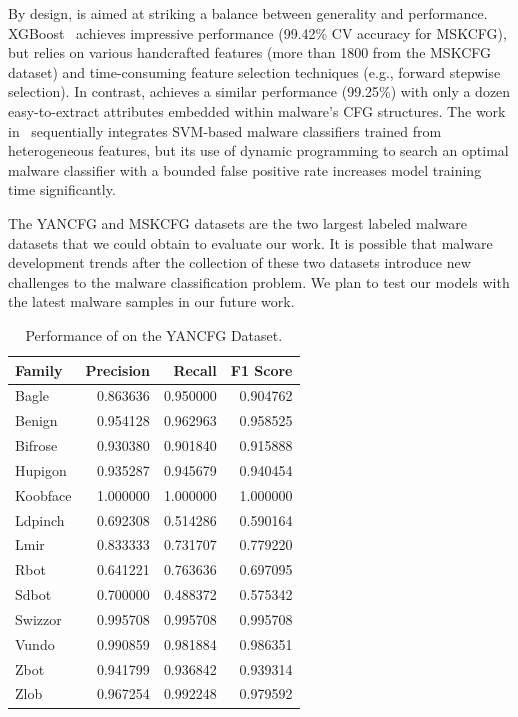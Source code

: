 By design, \sysname is aimed at striking a balance between generality and performance.
XGBoost~\cite{NovelFeatureFusion} achieves impressive performance (99.42\% CV accuracy for MSKCFG), but relies on various handcrafted features (more than 1800 from the MSKCFG dataset) and time-consuming feature selection techniques (e.g., forward stepwise selection).
In contrast, \sysname achieves a similar performance (99.25\%) with only a dozen easy-to-extract attributes embedded within malware’s CFG structures.
The work in~\cite{YanDataset} sequentially integrates SVM-based malware classifiers trained from heterogeneous features,
but its use of dynamic programming to search an optimal malware classifier with a bounded false positive rate increases model training time significantly.

The YANCFG and MSKCFG datasets are the two largest labeled malware datasets that we could obtain to evaluate our work.
It is possible that malware development trends after the collection of these two datasets introduce new challenges to the malware classification problem.
We plan to test our models with the latest malware samples in our future work.


\begin{table}
    \caption{Performance of \sysname on the YANCFG Dataset.}
    \begin{center}
        \begin{tabular}{l|rrr}
            \hline
            Family &  Precision &    Recall &  F1 Score \\
            \hline
            \hline
            Bagle &   0.863636 &  0.950000 &  0.904762 \\
            Benign &   0.954128 &  0.962963 &  0.958525 \\
            Bifrose &   0.930380 &  0.901840 &  0.915888 \\
            Hupigon &   0.935287 &  0.945679 &  0.940454 \\
            Koobface &   1.000000 &  1.000000 &  1.000000 \\
            Ldpinch &   0.692308 &  0.514286 &  0.590164 \\
            Lmir &   0.833333 &  0.731707 &  0.779220 \\
            Rbot &   0.641221 &  0.763636 &  0.697095 \\
            Sdbot &   0.700000 &  0.488372 &  0.575342 \\
            Swizzor &   0.995708 &  0.995708 &  0.995708 \\
            Vundo &   0.990859 &  0.981884 &  0.986351 \\
            Zbot &   0.941799 &  0.936842 &  0.939314 \\
            Zlob &   0.967254 &  0.992248 &  0.979592 \\
            \hline
        \end{tabular}
    \end{center}
    \label{MG:Tab:YANCFGScores}
\end{table}

